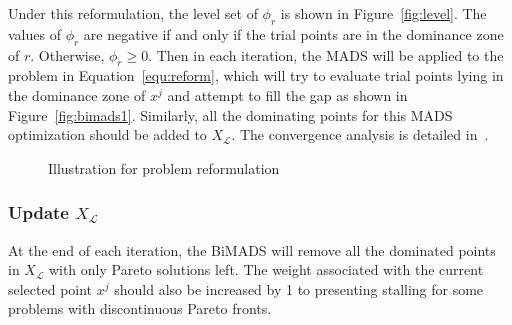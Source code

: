\documentclass[11pt,oneside,onecolumn,openright]{article}
\begin{document}
    \noindent Under this reformulation, the level set of $\phi_{r}$ is shown in Figure~\ref{fig:level}. The values of $\phi_{r}$ are negative if and only if the trial points are in the dominance zone of $r$. Otherwise, $\phi_{r}\geq0$. Then in each iteration, the MADS will be applied to the problem in Equation~\eqref{equ:reform}, which will try to evaluate trial points lying in the dominance zone of $x^j$ and attempt to fill the gap as shown in Figure~\ref{fig:bimads1}. Similarly, all the dominating points for this MADS optimization should be added to $X_\mathcal{L}$. The convergence analysis is detailed in~\cite{audet2008multiobjective}.
    \begin{figure}[h] 
    \centering 
          \hspace{0.3cm} 
          \caption{Illustration for problem reformulation~\cite{audet2017derivative}} 
            \label{fig:reform}
    \end{figure}
    \subsubsection*{Update $X_\mathcal{L}$}
    At the end of each iteration, the BiMADS will remove all the dominated points in $X_\mathcal{L}$ with only Pareto solutions left. The weight associated with the current selected point $x^j$ should also be increased by 1 to presenting stalling for some problems with discontinuous Pareto fronts.
\end{document}
